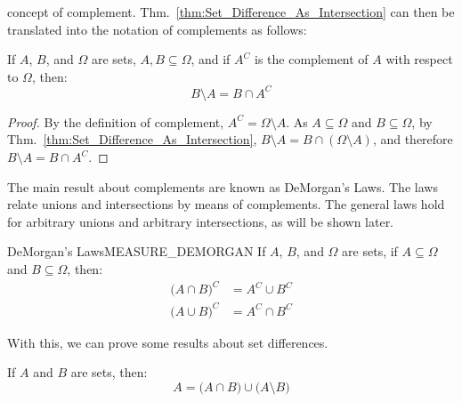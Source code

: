         concept of complement.
        Thm.~\ref{thm:Set_Difference_As_Intersection} can then be
        translated into the notation of complements as follows:
        \begin{theorem}
            If $A$, $B$, and $\Omega$ are sets,
            $A,B\subseteq\Omega$, and if $A^{C}$ is the
            complement of $A$ with respect to $\Omega$, then:
            \begin{equation}
                B\setminus{A}=B\cap{A}^{C}
            \end{equation}
        \end{theorem}
        \begin{proof}
            By the definition of complement,
            $A^{C}=\Omega\setminus{A}$.
            As $A\subseteq\Omega$ and $B\subseteq\Omega$, by
            Thm.~\ref{thm:Set_Difference_As_Intersection},
            $B\setminus{A}=B\cap(\Omega\setminus{A})$,
            and therefore $B\setminus{A}=B\cap{A}^{C}$.
        \end{proof}
        The main result about complements are known as
        DeMorgan's Laws. The laws relate unions and
        intersections by means of complements. The general
        laws hold for arbitrary unions and arbitrary
        intersections, as will be shown later.
        \begin{ftheorem}{DeMorgan's Laws}{MEASURE_DEMORGAN}
            If $A$, $B$, and $\Omega$ are sets, if
            $A\subseteq\Omega$ and $B\subseteq\Omega$, then:
            \begin{subequations}
                \begin{align}
                    \big(A\cap{B}\big)^{C}
                    &=A^{C}\cup{B}^{C}\\
                    \big(A\cup{B}\big)^{C}
                    &=A^{C}\cap{B}^{C}
                \end{align}
            \end{subequations}
        \end{ftheorem}
        With this, we can prove some results about
        set differences.
        \begin{theorem}
            If $A$ and $B$ are sets, then:
            \begin{equation}
                A=\big(A\cap{B}\big)
                    \cup\big(A\setminus{B}\big)
            \end{equation}
        \end{theorem}
